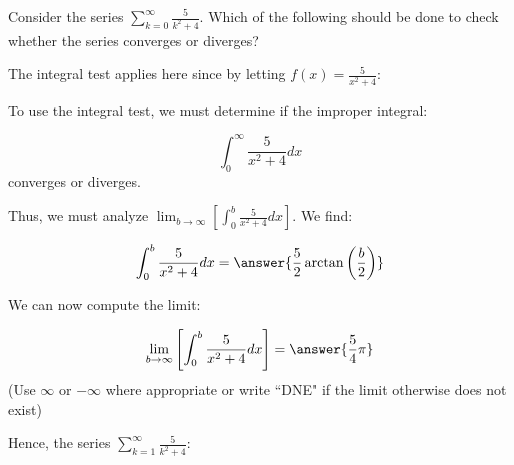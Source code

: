 \documentclass{ximera}
\author{Jim Talamo}
\begin{document}
\begin{exercise}
Consider the series $\sum_{k=0}^{\infty} \frac{5}{k^2+4}$.  Which of the following should be done to check whether the series converges or diverges?
\begin{multipleChoice}
\end{multipleChoice}

\begin{exercise}
The integral test applies here since by letting $f(x) = \frac{5}{x^2+4}$:
\begin{selectAll}
\end{selectAll}

To use the integral test, we must determine if the improper integral:

\[
\int_0^{\infty} \frac{5}{x^2+4} dx
\]
converges or diverges.

Thus, we must analyze $\lim_{b \to \infty} \left[\int_0^b \frac{5}{x^2+4} dx\right]$.  We find:

\[
\int_0^b \frac{5}{x^2+4} dx = \answer{\frac{5}{2} \arctan\left(\frac{b}{2}\right)}
\]

\begin{exercise}
We can now compute the limit:

\[ \lim_{b \to \infty} \left[\int_0^b \frac{5}{x^2+4} dx\right] = \answer{\frac{5}{4} \pi} \]
(Use $\infty$ or $-\infty$ where appropriate or write ``DNE" if the limit otherwise does not exist)

Hence, the series  $\sum_{k=1}^{\infty} \frac{5}{k^2+4}$:
\begin{multipleChoice}
\end{multipleChoice}
\end{exercise}
\end{exercise}
\end{exercise}
\end{document}
